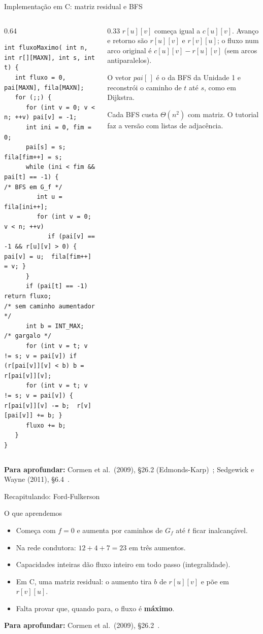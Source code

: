 \documentclass[aspectratio=169,xcolor=table]{beamer}
\newcommand{\fonte}[1]{%
  \vfill
  {\tiny\color{gray!55!black}\textbf{Para aprofundar:} #1\par}%
}
\begin{document}
\begin{frame}[fragile]{Implementação em C: matriz residual e BFS}
  \begin{columns}[T]
    \begin{column}{0.64\textwidth}
\begin{lstlisting}[basicstyle=\ttfamily\tiny]
int fluxoMaximo( int n, int r[][MAXN], int s, int t) {
   int fluxo = 0, pai[MAXN], fila[MAXN];
   for (;;) {
      for (int v = 0; v < n; ++v) pai[v] = -1;
      int ini = 0, fim = 0;
      pai[s] = s;  fila[fim++] = s;
      while (ini < fim && pai[t] == -1) {             /* BFS em G_f */
         int u = fila[ini++];
         for (int v = 0; v < n; ++v)
            if (pai[v] == -1 && r[u][v] > 0) { pai[v] = u;  fila[fim++] = v; }
      }
      if (pai[t] == -1) return fluxo;           /* sem caminho aumentador */
      int b = INT_MAX;                                 /* gargalo */
      for (int v = t; v != s; v = pai[v]) if (r[pai[v]][v] < b) b = r[pai[v]][v];
      for (int v = t; v != s; v = pai[v]) { r[pai[v]][v] -= b;  r[v][pai[v]] += b; }
      fluxo += b;
   }
}
\end{lstlisting}
    \end{column}
    \begin{column}{0.33\textwidth}
      \scriptsize
      $r[u][v]$ começa igual a $c[u][v]$. Avanço e retorno são $r[u][v]$ e $r[v][u]$; o
      fluxo num arco original é $c[u][v] - r[u][v]$ (sem arcos antiparalelos).
      \medskip

      O vetor $\mathit{pai}[\,]$ é o da BFS da Unidade 1 e reconstrói o caminho de $t$ até
      $s$, como em Dijkstra.
      \medskip

      Cada BFS custa $\Theta(n^2)$ com matriz. O tutorial faz a versão com listas de
      adjacência.
    \end{column}
  \end{columns}
  \fonte{Cormen et al.\ (2009), \S 26.2 (Edmonds-Karp)~\cite{cormen2009introduction};
    Sedgewick e Wayne (2011), \S 6.4~\cite{sedgewick2011algorithms}.}
\end{frame}

\begin{frame}{Recapitulando: Ford-Fulkerson}
  \begin{block}{O que aprendemos}
    \begin{itemize}
      \item Começa com $f = 0$ e aumenta por caminhos de $G_f$ até $t$ ficar inalcançável.
      \item Na rede condutora: $12 + 4 + 7 = 23$ em três aumentos.
      \item Capacidades inteiras dão fluxo inteiro em todo passo (integralidade).
      \item Em C, uma matriz residual: o aumento tira $b$ de $r[u][v]$ e põe em $r[v][u]$.
      \item Falta provar que, quando para, o fluxo é \textbf{máximo}.
    \end{itemize}
  \end{block}
  \fonte{Cormen et al.\ (2009), \S 26.2~\cite{cormen2009introduction}.}
\end{frame}
\end{document}

